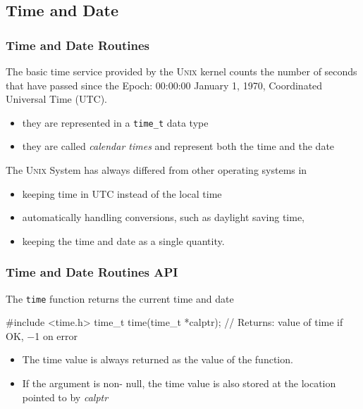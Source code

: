 \documentclass[newPxFont,sthlmFooter,nooffset]{beamer}
\begin{document}
\subsection{Time and Date}

\begin{frame}[t]
  \frametitle{Time and Date Routines}
The basic time service provided by the \textsc{Unix} kernel counts the number of seconds that have passed since the Epoch: 00:00:00 January 1, 1970, Coordinated Universal Time (UTC). 
\begin{itemize}
\item they are represented in a \texttt{time\_t} data type
\item they are called \textit{calendar times} and represent both the time and the date
\end{itemize}



The \textsc{Unix} System has always differed from other operating systems in
\begin{itemize}
\item keeping time in UTC instead of the local time
\item automatically handling conversions, such as daylight saving time,
\item keeping the time and date as a single quantity.
\end{itemize}


\end{frame}

\begin{frame}[containsverbatim,t]
  \frametitle{Time and Date Routines API}
The \texttt{time} function returns the current time and date
\begin{codedef}
#include <time.h>
time_t time(time_t *calptr);
// Returns: value of time if OK, −1 on error
\end{codedef}
\begin{itemize}
\item The time value is always returned as the value of the
  function.
\item If the argument is non- null, the time value is also
  stored at the location pointed to by \textit{calptr}
\end{itemize}
\end{frame}
\end{document}
